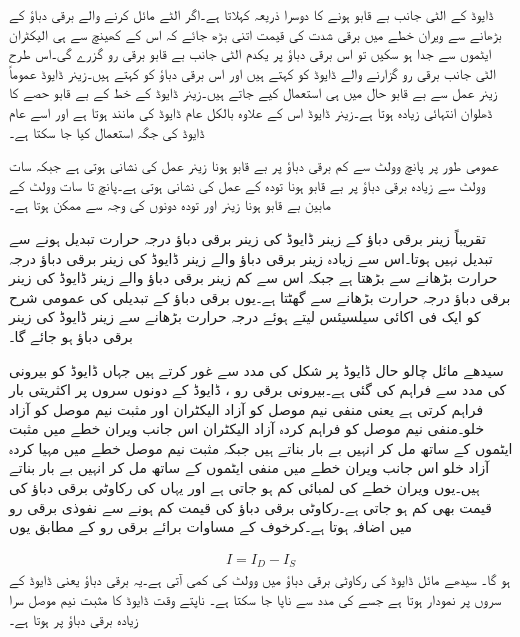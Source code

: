 ڈایوڈ کے الٹی جانب بے قابو ہونے کا دوسرا ذریعہ   کہلاتا ہے۔اگر الٹے مائل کرنے والے برقی دباؤ کے بڑھانے سے ویران خطے میں برقی شدت کی قیمت اتنی بڑھ جائے کہ اس کے کھینچ سے ہی الیکٹران ایٹموں سے جدا ہو سکیں تو اس برقی دباؤ پر یکدم الٹی جانب بے قابو برقی رو گزرے گی۔اس طرح الٹی جانب برقی رو گزارنے والے ڈایوڈ کو   کہتے ہیں اور اس برقی دباؤ   کو   کہتے ہیں۔زینر  ڈایوڈ عموماً زینر عمل سے بے قابو حال میں ہی استعمال کیے جاتے ہیں۔زینر  ڈایوڈ کے خط کے بے قابو حصے کا ڈھلوان  انتہائی زیادہ ہوتا  ہے۔زینر  ڈایوڈ اس کے علاوہ بالکل عام  ڈایوڈ کی مانند ہوتا ہے اور اسے عام  ڈایوڈ کی جگہ استعمال کیا جا سکتا ہے۔

عمومی طور پر پانچ وولٹ سے کم برقی دباؤ پر بے قابو ہونا زینر عمل کی نشانی ہوتی ہے جبکہ سات وولٹ سے زیادہ برقی دباؤ پر بے قابو ہونا تودہ کے عمل کی نشانی ہوتی ہے۔پانچ تا سات وولٹ کے مابین بے قابو ہونا زینر اور تودہ دونوں کی وجہ سے ممکن ہوتا ہے۔

تقریباً  زینر برقی دباؤ کے زینر ڈایوڈ کی زینر  برقی دباؤ درجہ حرارت تبدیل ہونے سے تبدیل نہیں ہوتا۔اس سے زیادہ زینر برقی دباؤ والے زینر ڈایوڈ کی زینر برقی دباؤ درجہ حرارت بڑھانے سے بڑھتا ہے جبکہ اس سے کم  زینر برقی دباؤ والے زینر ڈایوڈ کی زینر برقی دباؤ درجہ حرارت بڑھانے سے گھٹتا ہے۔یوں  برقی دباؤ کے تبدیلی کی عمومی شرح کو  ایک فی اکائی سیلسیئس  لیتے ہوئے درجہ حرارت  بڑھانے سے  زینر ڈایوڈ کی زینر برقی دباؤ  ہو جائے گا۔  

	سیدھے مائل چالو حال ڈایوڈ پر شکل   کی مدد سے غور کرتے ہیں جہاں ڈایوڈ کو بیرونی   کی مدد سے  فراہم کی گئی ہے۔بیرونی برقی رو ، ڈایوڈ کے دونوں سروں پر اکثریتی بار فراہم کرتی ہے یعنی منفی نیم موصل کو آزاد الیکٹران اور مثبت نیم موصل کو آزاد خلو۔منفی نیم موصل کو فراہم کردہ آزاد الیکٹران اس جانب ویران خطے میں مثبت ایٹموں کے ساتھ مل کر انہیں بے بار بناتے ہیں جبکہ مثبت نیم موصل خطے میں مہیا کردہ آزاد خلو اس جانب ویران خطے میں منفی ایٹموں کے ساتھ مل کر انہیں بے بار بناتے ہیں۔یوں ویران خطے کی لمبائی کم ہو جاتی ہے اور یہاں کی رکاوٹی برقی دباؤ کی قیمت بھی کم ہو جاتی ہے۔رکاوٹی برقی دباؤ کی قیمت کم ہونے سے نفوذی برقی رو  میں اضافہ ہوتا ہے۔کرخوف کے مساوات برائے برقی رو کے مطابق یوں

\begin{align} \label{مساوات_ڈایوڈ_رو_برابر_نفوذ_منفی_لبریزی_رو}
I=I_D-I_S
\end{align}
ہو گا۔
	سیدھے مائل ڈایوڈ کی رکاوٹی برقی دباؤ میں  وولٹ کی کمی آتی ہے۔یہ برقی دباؤ یعنی  ڈایوڈ کے سروں پر نمودار ہوتا ہے جسے  کی مدد سے ناپا جا سکتا ہے۔ ناپتے وقت ڈایوڈ کا مثبت نیم موصل سرا زیادہ برقی دباؤ پر ہوتا ہے۔

